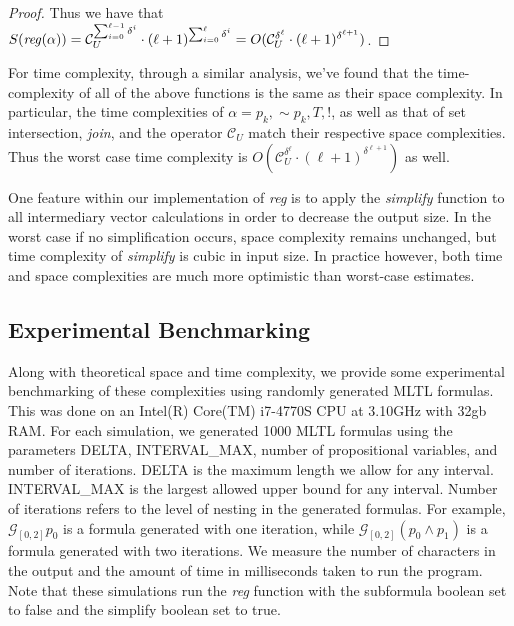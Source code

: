 \documentclass[runningheads]{llncs}
\begin{document}
\begin{proof}
    \noindent Thus we have that $S(\text{\emph{reg}}(\alpha)) = \mathcal{C}_U^{\sum_{i = 0}^{\ell - 1} \delta^i} \cdot (\ell + 1)^{\sum_{i = 0}^{\ell} \delta^i} = O(\mathcal{C}_U^{\delta ^ \ell} \cdot (\ell + 1)^{\delta^{\ell + 1}})$.
    
 \end{proof}

For time complexity, through a similar analysis, we've found that the time-complexity of all of the above functions is the same as their space complexity. In particular, the time complexities of $\alpha = p_k, \scriptstyle{\sim}\textstyle p_k, T, !$, as well as that of set intersection, \textit{join}, and the operator $\mathcal{C}_U$ match their respective space complexities. Thus the worst case time complexity is $O(\mathcal{C}_U^{\delta ^ \ell} \cdot (\ell + 1)^{\delta^{\ell + 1}})$ as well. 

One feature within our implementation of \textit{reg} is to apply the \textit{simplify} function to all intermediary vector calculations in order to decrease the output size. In the worst case if no simplification occurs, space complexity remains unchanged, but time complexity of \textit{simplify} is cubic in input size. In practice however, both time and space complexities are much more optimistic than worst-case estimates. 
 
\subsection{Experimental Benchmarking}
 Along with theoretical space and time complexity, we provide some experimental benchmarking of these complexities using randomly generated MLTL formulas.
This was done on an Intel(R) Core(TM) i7-4770S CPU at 3.10GHz with 32gb RAM.
For each simulation, we generated 1000 MLTL formulas using the parameters DELTA, INTERVAL\_MAX, number of propositional variables, and number of iterations. DELTA is the maximum length we allow for any interval. INTERVAL\_MAX is the largest allowed upper bound for any interval. Number of iterations refers to the level of nesting in the generated formulas. For example, $\mathcal{G}_{[0,2]}p_0$ is a formula generated with one iteration, while $\mathcal{G}_{[0,2]}(p_0 \land p_1)$ is a formula generated with two iterations. We measure the number of characters in the output and the amount of time in milliseconds taken to run the program. Note that these simulations run the \textit{reg} function with the subformula boolean set to false and the simplify boolean set to true.
\end{document}
